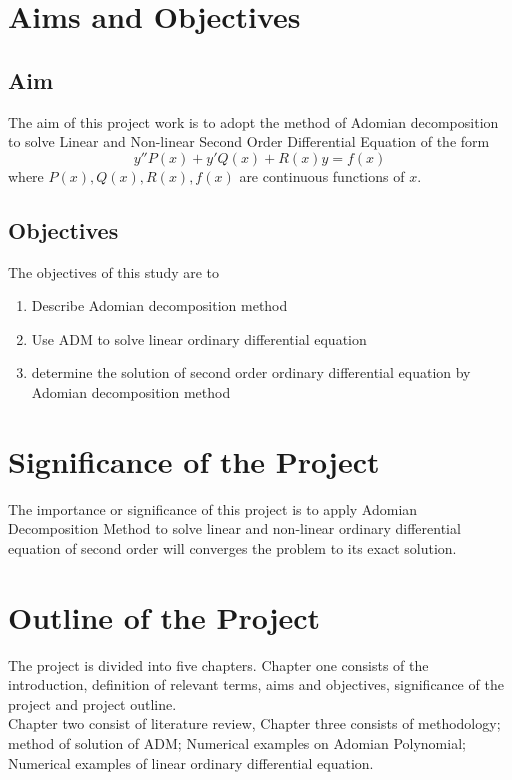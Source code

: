 \documentclass[11pt]{report}
\newcommand{\NI}{\noindent}
\newcommand{\sprime}{'}
\newcommand{\dprime}{''}
\begin{document}
	\section{Aims and Objectives}
	\subsection{Aim}
	The aim of this project work is to adopt the method of Adomian decomposition to solve Linear and Non-linear Second Order Differential Equation of the form 
	\begin{equation*}
		y\dprime P(x) + y\sprime Q(x) + R(x)y = f(x)
	\end{equation*}
	where $P(x), Q(x), R(x),f(x)$ are continuous functions of $x$.
	
	\subsection{Objectives}
	The objectives of this study are to 
	\begin{enumerate}
		\item Describe Adomian decomposition method
		\item Use ADM to solve linear ordinary differential equation
		\item determine the solution of second order ordinary differential equation by Adomian decomposition method
	\end{enumerate}
	
	\section{Significance of the Project}
	The importance or significance of this project is to apply Adomian Decomposition Method to solve linear and non-linear ordinary differential equation of second order will converges the problem to its exact solution.
	
	\section{Outline of the Project}
	The project is divided into five chapters. Chapter one consists of the introduction, definition of relevant terms, aims and objectives, significance of the project and project outline.\\
	
	\NI Chapter two consist of literature review, Chapter three consists of methodology; method of solution of ADM; Numerical examples on Adomian Polynomial; Numerical examples of linear ordinary differential equation.\\
	
\end{document}
